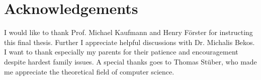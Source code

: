 \section{Acknowledgements}
I would like to thank Prof. Michael Kaufmann and Henry Förster for instructing this final thesis. Further I appreciate helpful discussions with Dr. Michalis Bekos. I want to thank especially my parents for their patience and encouragement despite hardest family issues. A special thanks goes to Thomas Stüber, who made me appreciate the theoretical field of computer science.